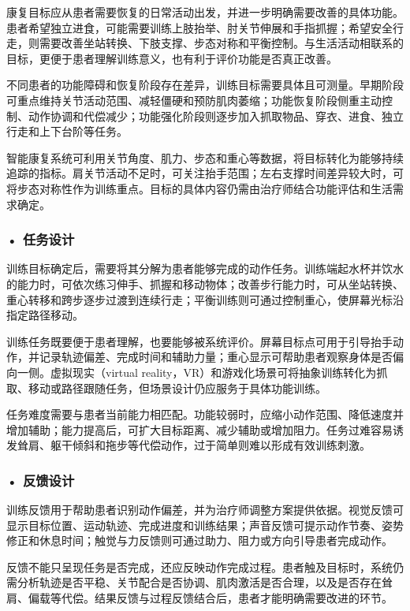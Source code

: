 康复目标应从患者需要恢复的日常活动出发，并进一步明确需要改善的具体功能。患者希望独立进食，可能需要训练上肢抬举、肘关节伸展和手指抓握；希望安全行走，则需要改善坐站转换、下肢支撑、步态对称和平衡控制。与生活活动相联系的目标，更便于患者理解训练意义，也有利于评价功能是否真正改善。

不同患者的功能障碍和恢复阶段存在差异，训练目标需要具体且可测量。早期阶段可重点维持关节活动范围、减轻僵硬和预防肌肉萎缩；功能恢复阶段侧重主动控制、动作协调和代偿减少；功能强化阶段则逐步加入抓取物品、穿衣、进食、独立行走和上下台阶等任务。

智能康复系统可利用关节角度、肌力、步态和重心等数据，将目标转化为能够持续追踪的指标。肩关节活动不足时，可关注抬手范围；左右支撑时间差异较大时，可将步态对称性作为训练重点。目标的具体内容仍需由治疗师结合功能评估和生活需求确定。

\subsubsection*{\textbf{• 任务设计}}

训练目标确定后，需要将其分解为患者能够完成的动作任务。训练端起水杯并饮水的能力时，可依次练习伸手、抓握和移动物体；改善步行能力时，可从坐站转换、重心转移和跨步逐步过渡到连续行走；平衡训练则可通过控制重心，使屏幕光标沿指定路径移动。

训练任务既要便于患者理解，也要能够被系统评价。屏幕目标点可用于引导抬手动作，并记录轨迹偏差、完成时间和辅助力量；重心显示可帮助患者观察身体是否偏向一侧。虚拟现实（virtual reality，VR）和游戏化场景可将抽象训练转化为抓取、移动或路径跟随任务，但场景设计仍应服务于具体功能训练。

任务难度需要与患者当前能力相匹配。功能较弱时，应缩小动作范围、降低速度并增加辅助；能力提高后，可扩大目标距离、减少辅助或增加阻力。任务过难容易诱发耸肩、躯干倾斜和拖步等代偿动作，过于简单则难以形成有效训练刺激。

\subsubsection*{\textbf{• 反馈设计}}

训练反馈用于帮助患者识别动作偏差，并为治疗师调整方案提供依据。视觉反馈可显示目标位置、运动轨迹、完成进度和训练结果；声音反馈可提示动作节奏、姿势修正和休息时间；触觉与力反馈则可通过助力、阻力或方向引导患者完成动作。

反馈不能只呈现任务是否完成，还应反映动作完成过程。患者触及目标时，系统仍需分析轨迹是否平稳、关节配合是否协调、肌肉激活是否合理，以及是否存在耸肩、偏载等代偿。结果反馈与过程反馈结合后，患者才能明确需要改进的环节。

